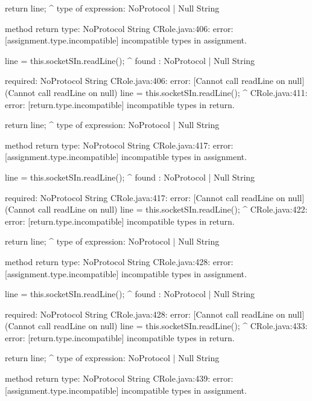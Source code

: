\begin{code}
        return line;
               ^
  type of expression: NoProtocol | Null String

  method return type: NoProtocol String
CRole.java:406: error: [assignment.type.incompatible] incompatible types in assignment.

            line = this.socketSIn.readLine();
                                          ^
  found   : NoProtocol | Null String

  required: NoProtocol String
CRole.java:406: error: [Cannot call readLine on null] (Cannot call readLine on null)
            line = this.socketSIn.readLine();
                                          ^
CRole.java:411: error: [return.type.incompatible] incompatible types in return.

        return line;
               ^
  type of expression: NoProtocol | Null String

  method return type: NoProtocol String
CRole.java:417: error: [assignment.type.incompatible] incompatible types in assignment.

            line = this.socketSIn.readLine();
                                          ^
  found   : NoProtocol | Null String

  required: NoProtocol String
CRole.java:417: error: [Cannot call readLine on null] (Cannot call readLine on null)
            line = this.socketSIn.readLine();
                                          ^
CRole.java:422: error: [return.type.incompatible] incompatible types in return.

        return line;
               ^
  type of expression: NoProtocol | Null String

  method return type: NoProtocol String
CRole.java:428: error: [assignment.type.incompatible] incompatible types in assignment.

            line = this.socketSIn.readLine();
                                          ^
  found   : NoProtocol | Null String

  required: NoProtocol String
CRole.java:428: error: [Cannot call readLine on null] (Cannot call readLine on null)
            line = this.socketSIn.readLine();
                                          ^
CRole.java:433: error: [return.type.incompatible] incompatible types in return.

        return line;
               ^
  type of expression: NoProtocol | Null String

  method return type: NoProtocol String
CRole.java:439: error: [assignment.type.incompatible] incompatible types in assignment.


\end{code}

